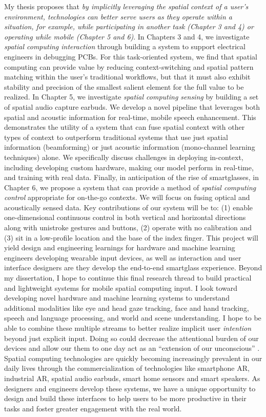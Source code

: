 \documentclass [11pt, proquest] {uwthesis}[2020/02/24]
\begin{document}
My thesis proposes that \textit{by implicitly leveraging the spatial context of a user’s environment, technologies can better serve users as they operate within a situation, for example, while participating in another task (Chapter 3 and 4) or operating while mobile (Chapter 5 and 6)}. In Chapters 3 and 4, we investigate \textit{spatial computing interaction} through building a system to support electrical engineers in debugging PCBs. For this task-oriented system, we find that spatial computing can provide value by reducing context-switching and spatial pattern matching within the user's traditional workflows, but that it must also exhibit stability and precision of the smallest salient element for the full value to be realized. In Chapter 5, we investigate \textit{spatial computing sensing} by building a set of spatial audio capture earbuds. We develop a novel pipeline that leverages both spatial and acoustic information for real-time, mobile speech enhancement. This demonstrates the utility of a system that can fuse spatial context with other types of context to outperform traditional systems that use just spatial information (beamforming) or just acoustic information (mono-channel learning techniques) alone. We specifically discuss challenges in deploying in-context, including developing custom hardware, making our model perform in real-time, and training with real data.
Finally, in anticipation of the rise of smartglasses, in Chapter 6, we propose a system that can provide a method of \textit{spatial computing control} appropriate for on-the-go contexts. We will focus on fusing optical and acoustically sensed data. Key contributions of our system will be to: (1) enable one-dimensional continuous control in both vertical and horizontal directions along with unistroke gestures and buttons, (2) operate with no calibration and (3) sit in a low-profile location and the base of the index finger. This project will yield design and engineering learnings for hardware and machine learning engineers developing wearable input devices, as well as interaction and user interface designers are they develop the end-to-end smartglass experience.
Beyond my dissertation, I hope to continue this final research thread to build practical and lightweight systems for mobile spatial computing input. I look toward developing novel hardware and machine learning systems to understand additional modalities like eye and head gaze tracking, face and hand tracking, speech and language processing, and world and scene understanding. I hope to be able to combine these multiple streams to better realize implicit user \textit{intention} beyond just explicit input. Doing so could decrease the attentional burden of our devices and allow our them to one day act as an “extension of our unconscious” \cite{Weiser1996-zr}.
Spatial computing technologies are quickly becoming increasingly prevalent in our daily lives through the commercialization of technologies like smartphone AR, industrial AR, spatial audio earbuds, smart home sensors and smart speakers. As designers and engineers develop these systems, we have a unique opportunity to design and build these interfaces to help users to be more productive in their tasks and foster greater engagement with the real world.
\end{document}
